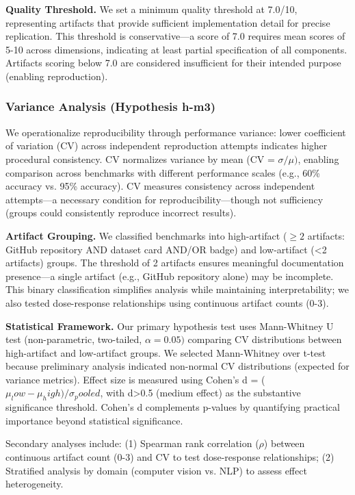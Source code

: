 \textbf{Quality Threshold.} We set a minimum quality threshold at 7.0/10, representing artifacts that provide sufficient implementation detail for precise replication. This threshold is conservative---a score of 7.0 requires mean scores of 5-10 across dimensions, indicating at least partial specification of all components. Artifacts scoring below 7.0 are considered insufficient for their intended purpose (enabling reproduction).

\subsubsection{Variance Analysis (Hypothesis h-m3)}

We operationalize reproducibility through performance variance: lower coefficient of variation (CV) across independent reproduction attempts indicates higher procedural consistency. CV normalizes variance by mean (CV = $\sigma /\mu )$, enabling comparison across benchmarks with different performance scales (e.g., 60\% accuracy vs. 95\% accuracy). CV measures consistency across independent attempts---a necessary condition for reproducibility---though not sufficiency (groups could consistently reproduce incorrect results).

\textbf{Artifact Grouping.} We classified benchmarks into high-artifact ($\geq 2$ artifacts: GitHub repository AND dataset card AND/OR badge) and low-artifact (<2 artifacts) groups. The threshold of 2 artifacts ensures meaningful documentation presence---a single artifact (e.g., GitHub repository alone) may be incomplete. This binary classification simplifies analysis while maintaining interpretability; we also tested dose-response relationships using continuous artifact counts (0-3).

\textbf{Statistical Framework.} Our primary hypothesis test uses Mann-Whitney U test (non-parametric, two-tailed, $\alpha =0.05)$ comparing CV distributions between high-artifact and low-artifact groups. We selected Mann-Whitney over t-test because preliminary analysis indicated non-normal CV distributions (expected for variance metrics). Effect size is measured using Cohen's d = ($\mu _low - \mu _high) / \sigma _pooled$, with d>0.5 (medium effect) as the substantive significance threshold. Cohen's d complements p-values by quantifying practical importance beyond statistical significance.

Secondary analyses include: (1) Spearman rank correlation ($\rho$) between continuous artifact count (0-3) and CV to test dose-response relationships; (2) Stratified analysis by domain (computer vision vs. NLP) to assess effect heterogeneity.

